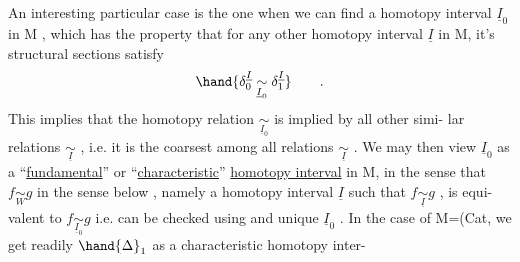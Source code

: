    An interesting particular case is the one when we can find a homotopy
interval  $\underline{I}_0$  in M ,  which has the property that for any other homotopy
interval $\underline{I}$ in M,  it's structural sections satisfy
\[ \hand{\delta^{\underline{I}}_0 \underset{\underline{I}_0}{\sim} \delta^{\underline{I}}_1} \qquad . \]
This implies that the homotopy relation $\underset{\underline{I}_0}{\sim}$ is implied by all other simi-%
lar relations $\underset{\underline{I}}{\sim}$ ,  i.e. it is the coarsest among all relations $\underset{\underline{I}}{\sim}$ .  We
may  then view $\underline{I}_0$ as a ``\uline{fundamental}'' or ``\uline{characteristic}'' \uline{homotopy
interval} in M,  in the sense that   $f\underset{W}{\sim}g$  in the sense below ,
namely   a homotopy  interval $\underline{I}$ such that $f\underset{\underline{I}}{\sim}g$ ,  is equi-%
valent to  $f\underset{\underline{I}_0}{\sim}g$  i.e. can be checked using  and unique  $\underline{I}_0$ .  In the
case of M=(Cat\hand{)},  we get readily $\hand{\Delta}_1$ as a characteristic homotopy inter-
